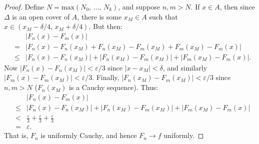 \documentclass{article}
\theoremstyle{normal}
\begin{document}
\begin{proof}
        Define $N=\textrm{max}(N_{0},\,\dots,\,N_{k})$, and suppose
        $n,m>N$. If $x\in{A}$, then since $\Delta$ is an open cover
        of $A$, there is some $x_{M}\in{A}$ such that
        $x\in(x_{M}-\delta/4,\,x_{M}+\delta/4)$. But then:
        \begin{equation}
            \begin{array}{rcl}
                &&
                \!\!
                \displaystyle
                |F_{n}(x)-F_{m}(x)|\\[1em]
                \!\!
                &=&
                \!\!
                \displaystyle
                |
                    F_{n}(x)-F_{n}(x_{M})
                    +
                    F_{n}(x_{M})-F_{m}(x_{M})
                    +
                    F_{m}(x_{M})-F_{m}(x)
                |\\[1em]
                \!\!
                &\leq&
                \!\!
                \displaystyle
                |F_{n}(x)-F_{n}(x_{M})|
                +
                |F_{n}(x_{M})-F_{m}(x_{M})|
                +
                |F_{m}(x_{M})-F_{m}(x)|.
            \end{array}
        \end{equation}
        Now $|F_{n}(x)-F_{n}(x_{M})|<\varepsilon/3$ since
        $|x-x_{M}|<\delta$, and similarly
        $|F_{m}(x)-F_{m}(x_{M})|<\varepsilon/3$.
        Finally, $|F_{n}(x_{M})-F_{m}(x_{M})|<\varepsilon/3$
        since $n,m>N$ ($F_{n}(x_{M})$ is a Cauchy sequence).
        Thus:
        \begin{equation}
            \begin{array}{rcl}
                &&
                \!\!
                \displaystyle
                |F_{n}(x)-F_{m}(x)|\\[1em]
                \!\!
                &\leq&
                \!\!
                \displaystyle
                |F_{n}(x)-F_{n}(x_{M})|
                +
                |F_{n}(x_{M})-F_{m}(x_{M})|
                +
                |F_{m}(x_{M})-F_{m}(x)|\\[1em]
                \!\!
                &<&
                \!\!
                \displaystyle
                \frac{\varepsilon}{3}
                +
                \frac{\varepsilon}{3}
                +
                \frac{\varepsilon}{3}\\[1em]
                \!\!
                &=&
                \!\!
                \displaystyle
                \varepsilon.
            \end{array}
        \end{equation}
        That is, $F_{n}$ is uniformly Cauchy, and hence
        $F_{n}\rightarrow{f}$ uniformly.
    \end{proof}
\end{document}
